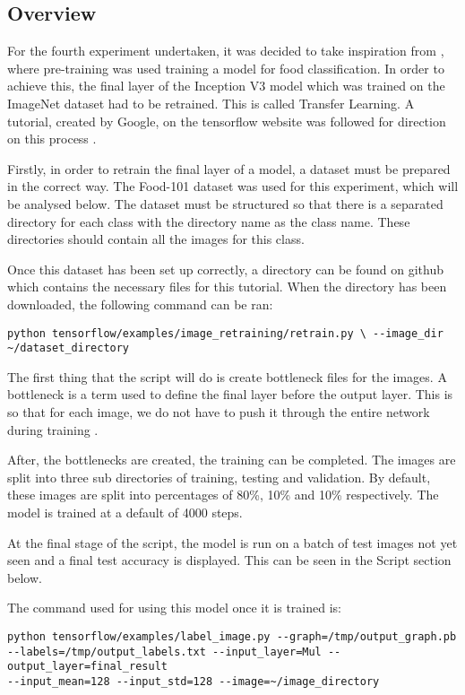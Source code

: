 \subsection*{Overview}
For the fourth experiment undertaken, it was decided to take inspiration from
\textcite{yanaiFood}, where pre-training was used training a model for food
classification. In order to achieve this, the final layer of the
Inception V3 model which was trained on the ImageNet dataset had to be retrained. This is called
Transfer Learning. A tutorial, created by Google, on the tensorflow website was followed
for direction on this process \textcite{retrainInception}.

Firstly, in order to retrain the final layer of a model, a dataset must be
prepared in the correct way. The Food-101 dataset \textcite{food101}
was used for this experiment, which will be analysed below. The dataset must be structured so that
there is a separated directory for each class with the directory name as the class
name. These directories should contain all the images for this class. 

Once this dataset has been set up correctly, a directory can be found on github
which contains the necessary files for this tutorial. When the directory has
been downloaded, the following command can be ran:
\begin{lstlisting}
python tensorflow/examples/image_retraining/retrain.py \ --image_dir
~/dataset_directory
\end{lstlisting}

The first thing that the script will do is create bottleneck files for the
images. A bottleneck is a term used to define the final layer before the output
layer. This is so that for each image, we do not have to push it through the
entire network during training \textcite{retrainInception}.

After, the bottlenecks are created, the training can be completed. The images
are split into three sub directories of training, testing and validation. By
default, these images are split into percentages of 80\%, 10\% and 10\%
respectively. The model is trained at a default of 4000 steps. 

At the final stage of the script, the model is run on a batch of test images not
yet seen and a final test accuracy is displayed. This can be seen in the Script
section below.

The command used for using this model once it is trained is:
\begin{lstlisting}
python tensorflow/examples/label_image.py --graph=/tmp/output_graph.pb
--labels=/tmp/output_labels.txt --input_layer=Mul --output_layer=final_result
--input_mean=128 --input_std=128 --image=~/image_directory
\end{lstlisting}

